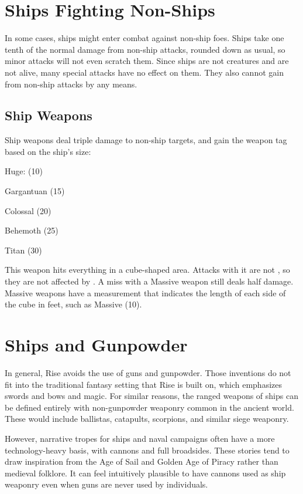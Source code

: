 \section{Ships Fighting Non-Ships}
  In some cases, ships might enter combat against non-ship foes.
  Ships take one tenth of the normal damage from non-ship attacks, rounded down as usual, so minor attacks will not even scratch them.
  Since ships are not creatures and are not alive, many special attacks have no effect on them.
  They also cannot gain  from non-ship attacks by any means.

  \subsection{Ship Weapons}
    Ship weapons deal triple damage to non-ship targets, and gain the  weapon tag based on the ship's size:
    \begin{raggeditemize}
      \item Huge:  (10)
      \item Gargantuan  (15)
      \item Colossal  (20)
      \item Behemoth  (25)
      \item Titan  (30)
    \end{raggeditemize}

     This weapon hits everything in a cube-shaped area.
    Attacks with it are not , so they are not affected by .
    A miss with a Massive weapon still deals half damage.
    Massive weapons have a measurement that indicates the length of each side of the cube in feet, such as Massive (10).

\section{Ships and Gunpowder}
  In general, Rise avoids the use of guns and gunpowder.
  Those inventions do not fit into the traditional fantasy setting that Rise is built on, which emphasizes swords and bows and magic.
  For similar reasons, the ranged weapons of ships can be defined entirely with non-gunpowder weaponry common in the ancient world.
  These would include ballistas, catapults, scorpions, and similar siege weaponry.

  However, narrative tropes for ships and naval campaigns often have a more technology-heavy basis, with cannons and full broadsides.
  These stories tend to draw inspiration from the Age of Sail and Golden Age of Piracy rather than medieval folklore.
  It can feel intuitively plausible to have cannons used as ship weaponry even when guns are never used by individuals.

